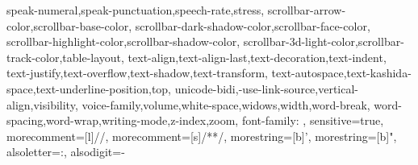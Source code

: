 {{        speak-numeral,speak-punctuation,speech-rate,stress,
        scrollbar-arrow-color,scrollbar-base-color,
        scrollbar-dark-shadow-color,scrollbar-face-color,
        scrollbar-highlight-color,scrollbar-shadow-color,
        scrollbar-3d-light-color,scrollbar-track-color,table-layout,
        text-align,text-align-last,text-decoration,text-indent,
        text-justify,text-overflow,text-shadow,text-transform,
        text-autospace,text-kashida-space,text-underline-position,top,
        unicode-bidi,-use-link-source,vertical-align,visibility,
        voice-family,volume,white-space,widows,width,word-break,
        word-spacing,word-wrap,writing-mode,z-index,zoom, font-family:
    },
    sensitive=true,
    morecomment=[l]{//},
    morecomment=[s]{/*}{*/},
    morestring=[b]',
    morestring=[b]",
    alsoletter={:},
    alsodigit={-}
}


